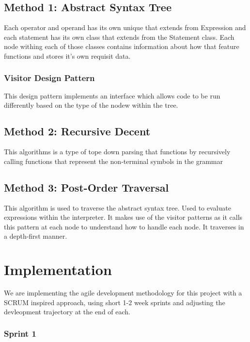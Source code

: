 \documentclass[a4paper, oneside, 11pt]{report}
\begin{document}
\section{Method 1: Abstract Syntax Tree}

Each operator and operand has its own unique that extends from Expression and each
statement has its own class that extends from the Statement class. Each node withing
each of those classes contains information about how that feature functions and stores it’s
own requisit data.

\subsection{Visitor Design Pattern}

This design pattern implements an interface which allows code to be run differently based
on the type of the nodew within the tree.

\section{Method 2: Recursive Decent}

This algorithms is a type of tope down parsing that functions by recursively calling functions that represent the non-terminal symbols in the grammar

\section{Method 3: Post-Order Traversal}

This algorithm is used to traverse the abstract syntax tree. Used to evaluate expressions
within the interpreter. It makes use of the visitor patterns as it calls this pattern at each
node to understand how to handle each node. It traverses in a depth-first manner.



\chapter{Implementation}\label{Impl}

We are implementing the agile development methodology for this project with a SCRUM inspired approach, using short 1-2 week sprints and adjusting the devleopment trajectory at the end of each.

\subsection{Sprint 1}
\end{document}
